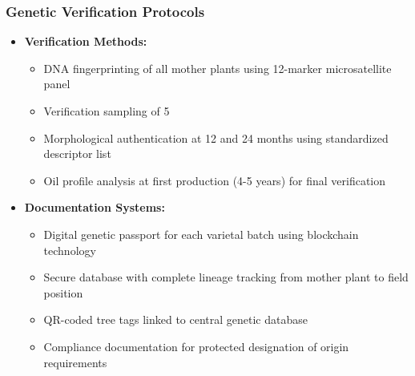 \subsubsection{Genetic Verification Protocols}
\begin{itemize}
    \item \textbf{Verification Methods:}
    \begin{itemize}
        \item DNA fingerprinting of all mother plants using 12-marker microsatellite panel
        \item Verification sampling of 5%
        \item Morphological authentication at 12 and 24 months using standardized descriptor list
        \item Oil profile analysis at first production (4-5 years) for final verification
    \end{itemize}
    \item \textbf{Documentation Systems:}
    \begin{itemize}
        \item Digital genetic passport for each varietal batch using blockchain technology
        \item Secure database with complete lineage tracking from mother plant to field position
        \item QR-coded tree tags linked to central genetic database
        \item Compliance documentation for protected designation of origin requirements
    \end{itemize}
\end{itemize}

